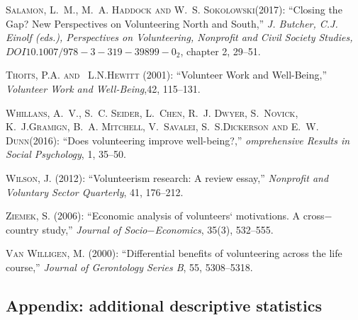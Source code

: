 \documentclass[10pt, letterpaper]{article}
\begin{document}
\begin{spacing}{1.4}
\begin{thebibliography}{87}
 \textsc{Salamon, L.~M., M.~A. Haddock and W.~S. Sokolowski}(2017):
 \enquote{Closing the Gap? New Perspectives on Volunteering North and South,} \emph{J. Butcher, C.J. Einolf (eds.), Perspectives on Volunteering, Nonprofit and Civil Society Studies, $DOI 10.1007/978-3-319-39899-0_2$}, chapter 2, 29--51.
  
\textsc{Thoits, P.A. and ~L.N.Hewitt } (2001): \enquote{Volunteer Work and Well-Being,} \emph{Volunteer Work and Well-Being},42, 115--131.


\textsc{Whillans, A.~V., S.~C. Seider, L.~Chen, R.~J. Dwyer, S.~Novick, K.~J.Gramign, B.~A. Mitchell, V.~Savalei, S.~S.Dickerson and E.~W. Dunn}(2016):
  \enquote{Does volunteering improve well-being?,} \emph{omprehensive Results in Social Psychology}, 1, 35--50.

  
\textsc{Wilson, J.} (2012): \enquote{Volunteerism research: A
  review essay,} \emph{Nonprofit and Voluntary Sector Quarterly}, 41, 176--212.

\textsc{Ziemek, S.} (2006): \enquote{Economic analysis of volunteers` motivations. A cross$-$country study,} \emph{Journal of Socio$-$Economics}, 35(3), 532--555.


\textsc{Van Willigen, M.} (2000): \enquote{Differential benefits of volunteering across the life course,} \emph{Journal of Gerontology Series B}, 55, 5308--5318.


\end{thebibliography}


\begin{spacing}{.9}

\section{Appendix: additional descriptive statistics}



\end{spacing}
\end{spacing}
\end{document}
